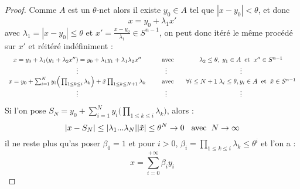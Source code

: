 \documentclass[12pt]{article}
\begin{document}
\begin{proof}
	Comme $A$ est un $\theta$-net alors il existe $y_0\in A$ tel que $|x-y_0|<\theta$, et donc
	\begin{equation*}
	x = y_0 + \lambda_1 x'
	\end{equation*}
	avec $\lambda_1= |x-y_0|\leq \theta$ et $x' = \frac{x-y_0}{\lambda_1}\in S^{n-1}$, on peut donc itéré le même procédé sur $x'$ et réitéré indéfiniment : 
	\begin{equation*}
	\begin{array}{ccc}
	x = y_0 + \lambda_1 (y_1+\lambda_2x'')=y_0+\lambda_1y_1+\lambda_1\lambda_2x'' &\text{\hspace{4mm} avec \hspace{2mm}}&  \lambda_2\leq \theta, \; y_1\in A \text{\hspace{2mm}et\hspace{2mm}} x''\in S^{n-1}\\
	\vdots&\vdots&\vdots\\
	x = y_0 + \sum_{i=1}^{N}y_i\Big(\prod_{1\leq k\leq i}\lambda_k\Big)+\tilde{x}\prod_{1\leq k\leq N+1}\lambda_k &\text{\hspace{4mm} avec \hspace{2mm}}&  \text{$\forall i\leq N+1$\hspace{1mm}} \lambda_i\leq \theta, y_i\in A \text{\hspace{2mm}et\hspace{2mm}} \tilde{x}\in S^{n-1}\\
	\vdots & \vdots & \vdots
	\end{array}
	\end{equation*} 
	Si l'on pose $S_N = y_0 + \sum_{i=1}^{N}y_i\Big(\prod_{1\leq k\leq i}\lambda_k\Big)$, alors :
	\begin{equation*}
	|x-S_N| \leq |\lambda_1 ... \lambda_N| |\tilde{x}|\leq \theta^{N} \to 0  \text{\hspace{3mm}avec\hspace{2mm}}  N\to \infty
	\end{equation*}
	il ne reste plus qu'as poser $\beta_0=1$ et pour $i>0$, $\beta_i=\prod_{1 \leq k\leq i}\lambda_k\leq \theta^i$ et l'on a :
	\begin{equation*}
	x = \sum_{i=0}^{+\infty} \beta_i y_i
	\end{equation*}
\end{proof}
\end{document}
